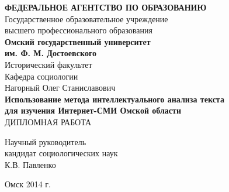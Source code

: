 \begin{titlepage}

\begin{center}
{\bf ФЕДЕРАЛЬНОЕ АГЕНТСТВО ПО ОБРАЗОВАНИЮ}\\
\vspace{0.5cm}
Государственное образовательное учреждение\\
высшего профессионального образования\\
\textbf{Омский государственный университет\\
им. Ф. М. Достоевского\\}
\vspace{0.5cm}
Исторический факультет\\
Кафедра социологии\\
\vspace{3cm}
Нагорный Олег Станиславович\\
\vspace{1cm}
\textbf{\large Использование метода интеллектуального анализа текста\\ для изучения Интернет-СМИ Омской области\\}
\vspace{2cm}
ДИПЛОМНАЯ РАБОТА\\

\vspace{4cm}
\end{center}

\begin{flushright}
Научный руководитель\\
кандидат социологических наук\\
К.В. Павленко\\
                                               
\vspace{4cm}

\begin{center}
Омск 2014 г.
\end{center}

\end{flushright}
\end{titlepage}